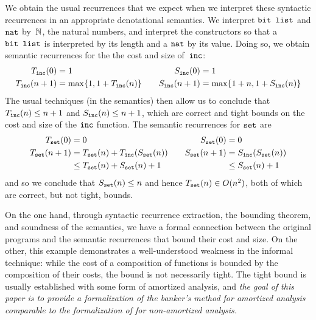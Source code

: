We obtain the usual recurrences that we expect when we interpret these
syntactic recurrences in an appropriate denotational semantics.  We
interpret $\texttt{bit\ list}$ and $\texttt{nat}$ by~$\mathbb{N}$, the natural numbers, and
interpret the constructors so that a $\texttt{bit\ list}$ is interpreted by its
length and a $\texttt{nat}$ by its value.  Doing so, we obtain semantic
recurrences for the the cost and size of~$\texttt{inc}$:
\[
\begin{aligned}
T_{\texttt{inc}}(0) &= 1 \\
T_{\texttt{inc}}(n+1) &= \max\{1, 1 + T_{\texttt{inc}}(n)\}
\end{aligned}
\qquad
\begin{aligned}
S_{\texttt{inc}}(0) &= 1 \\
S_{\texttt{inc}}(n+1) &= \max\{1 + n, 1 + S_{\texttt{inc}}(n)\}
\end{aligned}
\]
The usual techniques (in the semantics) then allow us to conclude that
$T_{\texttt{inc}}(n) \leq n + 1$ and $S_{\texttt{inc}}(n) \leq n + 1$, which are correct
and tight bounds on the cost and size of the $\texttt{inc}$ function.  The
semantic recurrences for $\texttt{set}$ are
\[
\begin{aligned}
T_{\texttt{set}}(0) &= 0 \\
T_{\texttt{set}}(n+1) &= T_{\texttt{set}}(n) + T_{\texttt{inc}}(S_{\texttt{set}}(n)) \\
                  &\leq T_{\texttt{set}}(n) + S_{\texttt{set}}(n) + 1
\end{aligned}
\qquad
\begin{aligned}
S_{\texttt{set}}(0) &= 0 \\
S_{\texttt{set}}(n+1) &= S_{\texttt{inc}}(S_{\texttt{set}}(n)) \\
                  &\leq S_{\texttt{set}}(n) + 1
\end{aligned}
\]
and so we conclude that $S_{\texttt{set}}(n)\leq n$ and hence
$T_{\texttt{set}}(n)\in O(n^2)$, both of which are correct, but not tight,
bounds.  

On the one hand, through syntactic recurrence extraction, the bounding
theorem, and soundness of the semantics, we have a formal connection between
the original programs and the semantic recurrences that bound their cost and
size.  On the other, this example demonstrates a well-understood weakness in
the informal technique:  while the cost of a composition of functions is
bounded by the composition of their costs, the bound is not necessarily
tight.  The tight bound is usually established with some form of amortized
analysis, and \emph{the goal of this paper is to provide a formalization of
the banker's method for amortized analysis comparable to the formalization
of \cite{danner-et-al:plpv13,danner-et-al:icfp15,hudson} for non-amortized
analysis.}

